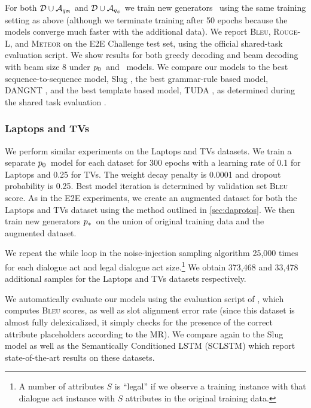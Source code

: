 For both $\mathcal{D} \cup {\ensuremath{\mathcal{A}}}_{{q_{\mathfrak{R}} }}$ and $\mathcal{D} \cup
{\ensuremath{\mathcal{A}}}_{{q_{\phi} }}$ we train new generators \auggen~using the same
training setting as above (although we terminate training after 50 epochs
because the models converge much faster with the additional data).  We report
\textsc{Bleu}, \textsc{Rouge-L}, and \textsc{Meteor} on the E2E Challenge test
set, using the official shared-task evaluation script.  We show results for
both greedy decoding and beam decoding with beam size 8 under $p_0$~and
\auggen~models. We compare our models to the best sequence-to-sequence model,
Slug \citep{juraska2018}, the best grammar-rule based model, DANGNT
\citep{nguyen2018}, and the best template based model, TUDA
\citep{puzikov2018}, as determined during the shared task evaluation
\citep{dusek2019}.

\subsubsection{Laptops and TVs}

We perform similar experiments on the Laptops and TVs datasets.  We train a
separate $p_0$~model for each dataset for 300 epochs with a learning rate
of 0.1 for Laptops and 0.25 for TVs. The weight decay penalty is 0.0001 and
dropout probability is 0.25. Best model iteration is determined by validation
set \textsc{Bleu} score. As in the E2E experiments, we create an augmented
dataset for both the Laptops and TVs dataset using the method outlined in
\autoref{sec:daprotos}. We then train new generators $p_*$~on the union of
original training data and the augmented dataset.

We repeat the while loop in the noise-injection sampling algorithm 25,000 times
for each dialogue act and legal dialogue act size.\footnote{A number of
attributes $S$ is ``legal'' if we observe a training instance with that
dialogue act instance with $S$  attributes in the original training data.} We
obtain 373,468 and 33,478 additional samples for the Laptops and TVs datasets
respectively.

We automatically evaluate our models using the evaluation script of
\citep{wen2016}, which computes \textsc{Bleu} scores, as well as slot alignment
error rate (since this dataset is almost fully delexicalized, it simply checks
for the presence of the correct attribute placeholders according to the MR). We
compare again to the Slug model as well as the Semantically Conditioned LSTM
(SCLSTM) \citep{wen2015} which report state-of-the-art results on these
datasets.


